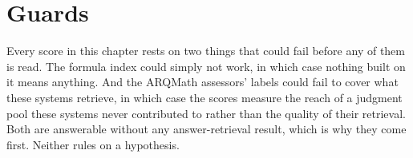 \section{Guards}\label{sec:ret-guards}\label{sec:met-hole-problem}

Every score in this chapter rests on two things that could fail before any of them is read. The
formula index could simply not work, in which case nothing built on it means anything. And the
ARQMath assessors' labels could fail to cover what these systems retrieve, in which case the
scores measure the reach of a judgment pool these systems never contributed to rather than the
quality of their retrieval. Both are answerable without any answer-retrieval result, which is why
they come first. Neither rules on a hypothesis.

